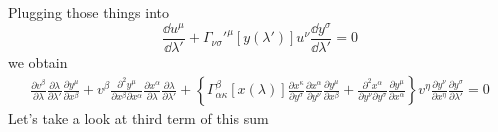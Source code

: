 %
Plugging those things into
%
\begin{equation}
    \frac{\dd u^\mu}{\dd\lambda'} +
    \Gamma_{\nu\sigma}'^{\mu}\left[y(\lambda')\right]u^\nu\frac{\dd y^\sigma}{\dd \lambda'}=0
\end{equation}
%
we obtain
%
\begin{gather}
    \frac{\partial v^\beta}{\partial\lambda}
    \frac{\partial \lambda}{\partial\lambda'}
    \frac{\partial y^\mu}{\partial x^\beta} +
    v^\beta\frac{\partial^2 y^\mu}{\partial x^\beta \partial x^\alpha}
    \frac{\partial x^\alpha}{\partial \lambda}
    \frac{\partial \lambda}{\partial \lambda'} +
    \left\{\Gamma_{\alpha\kappa}^\beta\left[x(\lambda)\right]
    \frac{\partial x^\kappa}{\partial y^\sigma}
    \frac{\partial x^\alpha}{\partial y^\nu}
    \frac{\partial y^\mu}{\partial x^\beta}
    +
    \frac{\partial^2 x^\alpha}{\partial y^\nu \partial y^\sigma}
    \frac{\partial y^\mu}{\partial x^\alpha}\right\}
    v^\eta \frac{\partial y^\nu}{\partial x^\eta}
    \frac{\partial y^\sigma}{\partial \lambda'}=0
\end{gather}
%
Let's take a look at third term of this sum
%
